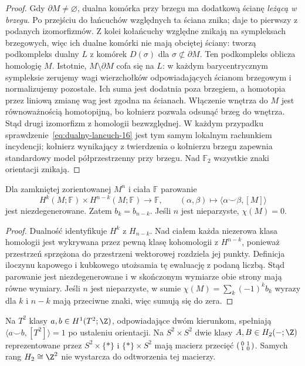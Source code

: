 \begin{proof}
Gdy $\partial M\ne\varnothing$,
dualna komórka przy brzegu
ma dodatkową ścianę
\emph{leżącą w brzegu}.
Po przejściu do łańcuchów
względnych ta ściana znika;
daje to pierwszy z podanych
izomorfizmów. Z kolei
kołańcuchy względne znikają
na sympleksach brzegowych,
więc ich dualne komórki
nie mają obciętej ściany:
tworzą podkompleks dualny $L$ z komórek
$D(\sigma)$ dla $\sigma\not\subset\partial M$.
Ten podkompleks oblicza homologię $M$.
Istotnie, $M\setminus\partial M$ cofa się na $L$:
w każdym barycentrycznym sympleksie zerujemy wagi
wierzchołków odpowiadających ścianom brzegowym
i normalizujemy pozostałe. Ich suma jest dodatnia
poza brzegiem, a homotopia przez liniową zmianę wag
jest zgodna na ścianach. Włączenie wnętrza do $M$
jest równoważnością homotopijną, bo kołnierz pozwala
odsunąć brzeg do wnętrza. Stąd drugi izomorfizm
z homologii bezwzględnej.
W każdym przypadku
sprawdzenie~\eqref{eq:dualny-lancuch-16}
jest tym samym lokalnym
rachunkiem incydencji;
kołnierz wynikający z twierdzenia o kołnierzu brzegu
zapewnia standardowy model
półprzestrzenny przy brzegu.
Nad $\mathbb F_2$ wszystkie
znaki orientacji znikają.
\end{proof}

\begin{wniosek}
\label{cor:pd-parowanie-16}
Dla zamkniętej zorientowanej
$M^n$ i ciała $\mathbb F$
parowanie
\[
 H^k(M;\mathbb F)\times
 H^{n-k}(M;\mathbb F)
 \longrightarrow\mathbb F,\qquad
 (\alpha,\beta)\longmapsto
      \langle\alpha\smile\beta,[M]\rangle
\]
jest niezdegenerowane. Zatem
$b_k=b_{n-k}$. Jeśli $n$
jest nieparzyste, $\chi(M)=0$.
\end{wniosek}
\begin{proof}
Dualność identyfikuje
$H^k$ z $H_{n-k}$.
Nad ciałem każda niezerowa
klasa homologii jest wykrywana
przez pewną klasę kohomologii
z $H^{n-k}$, ponieważ przestrzeń sprzężona
do przestrzeni wektorowej rozdziela jej punkty.
Definicja iloczynu kapowego
i kubkowego utożsamia tę
ewaluację z podaną liczbą.
Stąd parowanie jest
niezdegenerowane i w skończonym
wymiarze obie strony mają
równe wymiary. Jeśli $n$
jest nieparzyste, w sumie
$\chi(M)=\sum_k(-1)^kb_k$
wyrazy dla $k$ i $n-k$
mają przeciwne znaki,
więc sumują się do zera.
\end{proof}

\begin{przyklad}
Na $T^2$ klasy
$a,b\in H^1(T^2;\Z)$,
odpowiadające dwóm kierunkom,
spełniają
$\langle a\smile b,[T^2]\rangle=1$
po ustaleniu orientacji.
Na $S^2\times S^2$ dwie
klasy $A,B\in H_2(-;\Z)$
reprezentowane przez
$S^2\times\{*\}$ i
$\{*\}\times S^2$
mają macierz przecięć
$\begin{psmallmatrix}0&1\\1&0\end{psmallmatrix}$.
Samych rang $H_2\cong\Z^2$
nie wystarcza do odtworzenia
tej macierzy.
\end{przyklad}

